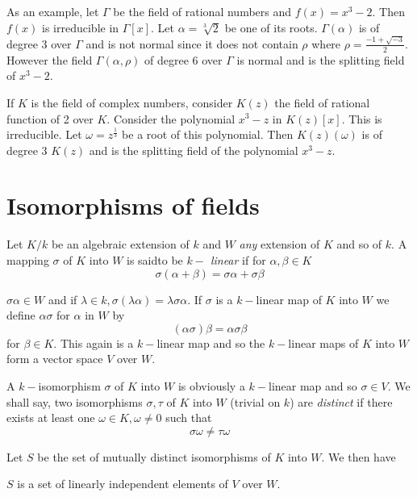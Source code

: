 As an example, let $ \Gamma $ be the field of rational numbers  and $
f (x) = x^3 - 2$. Then $ f (x) $ is irreducible in $ \Gamma [ x ]
$. Let $ \alpha = \sqrt[3]{2}$ be  one of its roots. $ \Gamma (
\alpha ) $ is of degree 3 over $ \Gamma $ and is not normal since
it does not contain $ \rho$ where $ \rho = \frac{ -1 +
  \sqrt{-3}}{2} $. However the field $ \Gamma ( \alpha, \rho ) $ of
degree 6 over $ \Gamma $ is normal and is the splitting field of  $
x^3 - 2 $. 

If $K$ is the field of  complex numbers, consider $ K(z)$ the field of
rational function of 2 over $K$. Consider the polynomial $ x^3 -z $
in $ K (z) [ x ] $. This is irreducible. Let  $ \omega =
z^{\frac{1}{3}} $  be a root of this polynomial. Then $K(z)  (\omega)$
is of degree 3  $K(z)$ and is the splitting field of the polynomial
$ x^3 - z$. 

\section{Isomorphisms of fields}\label{c2:s3}%

 Let $ K/k $  be an algebraic extension of $ k$ and $ W $
 \textit{any} extension of $ K $ and so of $k$. A mapping $ \sigma $
 of $ K $ into $ W $ is  said\pageoriginale to  be \textit{$k-$
   linear} if for $  \alpha, \beta \in K$  
$$
\sigma ( \alpha + \beta ) = \sigma \alpha + \sigma \beta 
$$

$\sigma \alpha \in W $ and if $ \lambda \in k, \sigma ( \lambda \alpha
) = \lambda \sigma \alpha $. If $ \sigma $ is a $k-$linear map of $ K
$ into $ W $ we define $\alpha \sigma $ for $\alpha$ in $ W $ by 
 $$
 ( \alpha \sigma ) \beta = \alpha \sigma \beta
 $$
 for $ \beta \in K $. This again is a $k-$linear map and so the
 $k-$linear maps of $K$ into $W$ form a vector space $V$ over $W$. 

A $k-$isomorphism $\sigma$ of $K$ into $W$ is obviously a $k- $linear
map and so $\sigma \in V $. We shall say, two isomorphisms $
\sigma, \tau $ of $K$  into $W$ (trivial on $k$) are
\textit{distinct} if there exists at least one $ \omega \in K, 
\omega \neq 0 $ such that  
$$
\sigma \omega \neq \tau \omega
$$

Let $S$ be the set of mutually distinct isomorphisms of $K$  into
$W$. We then have  

\begin{thm}\label{c2:thm3}%
$S$ is a set of linearly independent elements of $V$ over $W$.
\end{thm}

